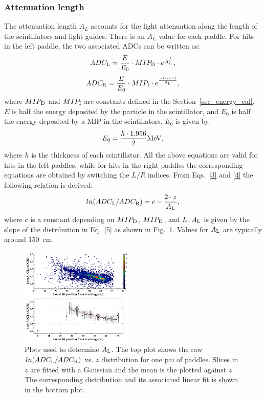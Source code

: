 \subsubsection{Attenuation length }
The attenuation length $A_{L}$ accounts for the light attenuation along the length of the scintillators and light guides. There is an $A_{L}$ value for each paddle.
For hits in the left paddle, the two associated ADCs can be written as:
\begin{equation}
\label{3}
ADC_{\rm{L}}=\frac{E}{E_0}\cdot MIP_{\rm{D}}\cdot e^{\frac{-z}{A_{L}}},
\end{equation}
\begin{equation}
\label{4}
ADC_{\rm{R}}=\frac{E}{E_0}\cdot MIP_{\rm{I}}\cdot e^{\frac{-(L-z)}{A_{\rm{L}}}},
\end{equation}
where $MIP_{\rm{D}}$ and $MIP_{\rm{I}}$ are constants defined in the Section~\ref{sec_energy_cal}, $E$ is half the energy deposited by the particle in the scintillator, and $E_0$ is half the energy deposited by a MIP in the scintillators.
$E_0$ is given by:
\begin{equation}\label{eq_def_e0}
E_0=\frac{h\cdot 1.956}{2} \rm{MeV},
\end{equation}
where $h$ is the thickness of each scintillator.
All the above equations are valid for hits in the left paddles, while for hits in the right paddles the corresponding equations are obtained by switching the $L/R$ indices.
From Eqs.~\ref{3} and \ref{4} the following relation is derived:
\begin{equation}
\label{5}
ln(ADC_{\rm{L}}/ADC_{\rm{R}})=c-\frac{2\cdot z}{A_{\rm{L}}},
\end{equation}
where $c$ is a constant depending on $MIP_{\rm{D}}$, $MIP_{\rm{D}}$, and $L$. $A_{\rm{L}}$ is given by the slope of the distribution in Eq.~\ref{5} as shown in Fig.~\ref{attl}. Values for $A_{\rm{L}}$ are typically around 150~cm.

\begin{figure}[htb]
\begin{center}
\includegraphics[width=0.48\textwidth]{Figure/attl1.png} 
\end{center}
\caption{Plots used to determine $A_{\rm{L}}$. The top plot shows the raw $ln(ADC_{\rm{L}}/ADC_{\rm{R}})$ vs. $z$ distribution for one pai of paddles. Slices in $z$ are fitted with a Gaussian and the mean is the plotted against $z$. The corresponding distribution and its associated linear fit is shown in the bottom plot.}
\label{attl}
\end{figure}

